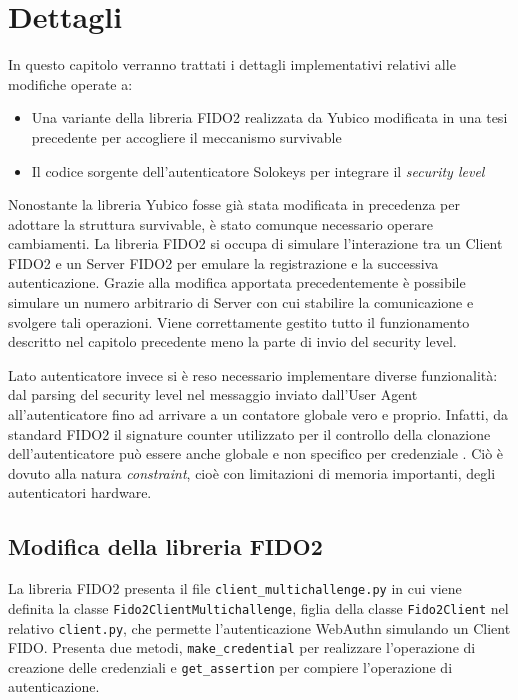 \chapter{Dettagli}
\label{dettagli}

In questo capitolo verranno trattati i dettagli implementativi relativi alle modifiche operate a:
\begin{itemize}
	\item Una variante della libreria FIDO2 realizzata da Yubico modificata in una tesi precedente per accogliere il meccanismo survivable \cite{yubico:fido}
	\item Il codice sorgente dell'autenticatore Solokeys \cite{solokeys:code} per integrare il \emph{security level}
\end{itemize}

Nonostante la libreria Yubico fosse già stata modificata in precedenza per adottare la struttura survivable, è stato comunque necessario operare cambiamenti. La libreria FIDO2 si occupa di simulare l'interazione tra un Client FIDO2 e un Server FIDO2 per emulare la registrazione e la successiva autenticazione. Grazie alla modifica apportata precedentemente è possibile simulare un numero arbitrario di Server con cui stabilire la comunicazione e svolgere tali operazioni. Viene correttamente gestito tutto il funzionamento descritto nel capitolo precedente meno la parte di invio del security level.

Lato autenticatore invece si è reso necessario implementare diverse funzionalità: dal parsing del security level nel messaggio inviato dall'User Agent all'autenticatore fino ad arrivare a un contatore globale vero e proprio. Infatti, da standard FIDO2 il signature counter utilizzato per il controllo della clonazione dell'autenticatore può essere anche globale e non specifico per credenziale \cite{fido:signature_counter}. Ciò è dovuto alla natura \emph{constraint}, cioè con limitazioni di memoria importanti, degli autenticatori hardware.

\section{Modifica della libreria FIDO2}
\label{modifica_fido}

La libreria FIDO2 presenta il file \verb*|client_multichallenge.py| in cui viene definita la classe \verb*|Fido2ClientMultichallenge|, figlia della classe \verb*|Fido2Client| nel relativo \verb*|client.py|, che permette l'autenticazione WebAuthn simulando un Client FIDO. Presenta due metodi, \verb*|make_credential| per realizzare l'operazione di creazione delle credenziali e \verb*|get_assertion| per compiere l'operazione di autenticazione. 

